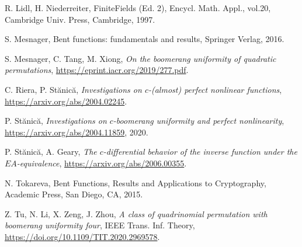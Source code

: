 \documentclass[11pt]{article}
\def\F{{\mathbb F}}
\begin{document}
\begin{thebibliography}{99}

R. Lidl, H. Niederreiter, FiniteFields (Ed. 2), Encycl. Math. Appl., vol.20, Cambridge Univ. Press, Cambridge, 1997.

 S. Mesnager, { Bent functions: fundamentals and results}, Springer Verlag, 2016.

S. Mesnager, C. Tang, M. Xiong, {\em On the boomerang uniformity of quadratic permutations}, \url{https://eprint.iacr.org/2019/277.pdf}.



 

C. Riera, P. St\u anic\u a,
 {\em Investigations on $c$-(almost) perfect nonlinear functions}, 
 \url{https://arxiv.org/abs/2004.02245}.
 
 P. St\u anic\u a, {\em Investigations on $c$-boomerang uniformity and perfect nonlinearity}, \url{https://arxiv.org/abs/2004.11859}, 2020.
 
 P. St\u anic\u a, A. Geary,
 {\em The $c$-differential behavior of the inverse function under the $EA$-equivalence},
 \url{https://arxiv.org/abs/2006.00355}.
 
 
 N. Tokareva, { Bent Functions, Results and Applications to Cryptography}, Academic Press, San Diego, CA,  2015.

Z. Tu, N. Li, X. Zeng, J. Zhou, {\em A class of quadrinomial permutation with boomerang uniformity four},  IEEE Trans. Inf. Theory, 
\url{https://doi.org/10.1109/TIT.2020.2969578}.


\end{thebibliography}
\end{document}
